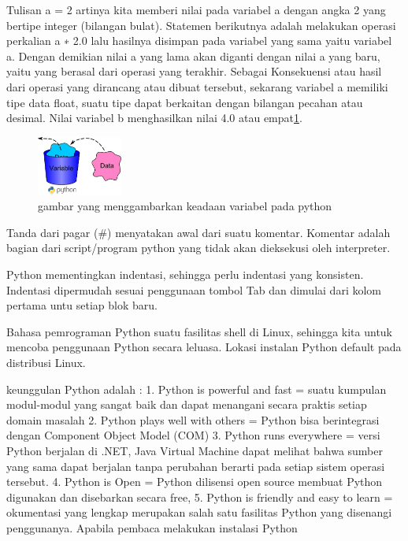 Tulisan a = 2 artinya kita memberi nilai pada variabel a dengan angka 2 yang bertipe integer
(bilangan bulat). Statemen berikutnya adalah melakukan operasi perkalian a ∗ 2.0 lalu hasilnya
disimpan pada variabel yang sama yaitu variabel a. Dengan demikian nilai a yang lama
akan diganti dengan nilai a yang baru, yaitu yang berasal dari operasi yang terakhir.
Sebagai Konsekuensi atau hasil dari operasi yang dirancang atau dibuat tersebut, 
sekarang variabel a memiliki tipe data float, 
suatu tipe dapat berkaitan dengan bilangan pecahan atau desimal. 
Nilai variabel b menghasilkan nilai 4.0 atau empat\ref{pythonvariable}.
\begin{figure}[ht]
    \centerline{\includegraphics[width=0.25\textwidth]{figures/pythonvariable.png}}
    \caption{gambar yang menggambarkan keadaan variabel pada python}
    \label{pythonvariable}
    \end{figure}

Tanda dari pagar (#) menyatakan awal dari suatu komentar. Komentar adalah bagian dari
script/program python yang tidak akan dieksekusi oleh interpreter. 

Python mementingkan indentasi, sehingga perlu indentasi yang konsisten. Indentasi dipermudah sesuai penggunaan
tombol Tab dan dimulai dari kolom pertama untu setiap blok baru. 

Bahasa pemrograman Python suatu fasilitas  shell di Linux, sehingga kita untuk mencoba penggunaan
Python secara leluasa. Lokasi instalan Python default pada distribusi Linux.

keunggulan Python adalah :
1. Python is powerful and fast = suatu kumpulan modul-modul yang sangat baik dan dapat menangani secara praktis setiap domain masalah
2. Python plays well with others = Python bisa berintegrasi dengan Component Object Model (COM) 
3. Python runs everywhere = versi Python berjalan di .NET, Java Virtual Machine dapat melihat bahwa sumber yang sama dapat berjalan tanpa perubahan berarti pada setiap sistem operasi tersebut.
4. Python is Open = Python dilisensi open source membuat Python digunakan dan disebarkan secara free,
5. Python is friendly and easy to learn = okumentasi yang lengkap merupakan salah satu fasilitas Python yang disenangi penggunanya. Apabila pembaca melakukan instalasi Python

